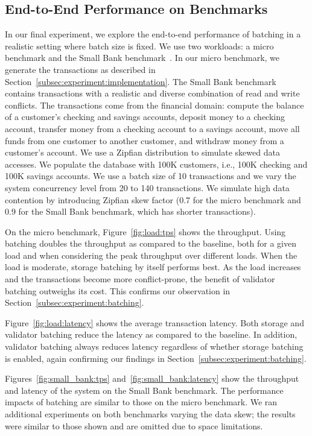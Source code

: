 \subsection{End-to-End Performance on Benchmarks}
\label{subsec:experiment:end2end}
In our final experiment, we explore the end-to-end performance of batching in a realistic setting where batch size is fixed. We use two workloads: a micro benchmark and the Small Bank benchmark~\cite{alomari2008icde}. In our micro benchmark,  we generate the transactions as described in Section~\ref{subsec:experiment:implementation}.  The Small Bank benchmark contains transactions with a realistic and diverse combination of read and write conflicts. The transactions come from the financial domain: compute the balance of a customer's checking and savings accounts, deposit money to a checking account, transfer money from a checking account to a savings account, move all funds from one customer to another customer, and withdraw money from a customer's account. We use a Zipfian distribution to simulate skewed data accesses. We populate the database with 100K customers, i.e., 100K checking and 100K savings accounts. We use a batch size of 10 transactions and we vary the system concurrency level from 20 to 140 transactions. We simulate high data contention by introducing Zipfian skew factor (0.7 for the micro benchmark and 0.9 for the Small Bank benchmark, which has shorter transactions).


On the micro benchmark, Figure~\ref{fig:load:tps} shows the throughput. 
Using batching doubles the throughput as compared to the baseline, both for a given load and when considering the peak throughput over different loads. When the load is moderate, storage batching by itself performs best. As the load increases and the transactions become more conflict-prone, the benefit of validator batching outweighs its cost. This confirms our observation in Section~\ref{subsec:experiment:batching}. 

Figure~\ref{fig:load:latency} shows the average transaction latency. Both storage and validator batching reduce the latency as compared to the baseline. In addition, validator batching always reduces latency regardless of whether storage batching is enabled, again confirming our findings in Section~\ref{subsec:experiment:batching}.

Figures~\ref{fig:small_bank:tps} and~\ref{fig:small_bank:latency} show the throughput and latency of the system on the Small Bank benchmark. 
The performance impacts of batching are similar to those on the micro benchmark.
We ran additional experiments on both benchmarks varying the data skew; the results were similar to those shown and are omitted due to space limitations.
